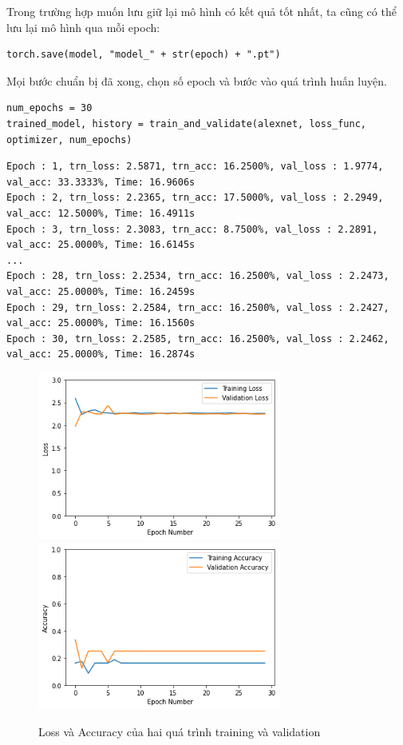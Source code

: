 \documentclass[a4paper]{article}
\begin{document}
Trong trường hợp muốn lưu giữ lại mô hình có kết quả tốt nhất, ta cũng có thể lưu lại mô hình qua mỗi epoch:
\begin{lstlisting}
torch.save(model, "model_" + str(epoch) + ".pt")
\end{lstlisting}
Mọi bước chuẩn bị đã xong, chọn số epoch và bước vào quá trình huấn luyện.
\begin{lstlisting}
num_epochs = 30
trained_model, history = train_and_validate(alexnet, loss_func, optimizer, num_epochs)
\end{lstlisting}
\begin{verbatim}
Epoch : 1, trn_loss: 2.5871, trn_acc: 16.2500%, val_loss : 1.9774, val_acc: 33.3333%, Time: 16.9606s
Epoch : 2, trn_loss: 2.2365, trn_acc: 17.5000%, val_loss : 2.2949, val_acc: 12.5000%, Time: 16.4911s
Epoch : 3, trn_loss: 2.3083, trn_acc: 8.7500%, val_loss : 2.2891, val_acc: 25.0000%, Time: 16.6145s
...
Epoch : 28, trn_loss: 2.2534, trn_acc: 16.2500%, val_loss : 2.2473, val_acc: 25.0000%, Time: 16.2459s
Epoch : 29, trn_loss: 2.2584, trn_acc: 16.2500%, val_loss : 2.2427, val_acc: 25.0000%, Time: 16.1560s
Epoch : 30, trn_loss: 2.2585, trn_acc: 16.2500%, val_loss : 2.2462, val_acc: 25.0000%, Time: 16.2874s
\end{verbatim}
\begin{figure}[h!]
\centering
{{\includegraphics[width=8cm]{images/loss.png} }}
\qquad
{{\includegraphics[width=8cm]{images/acc.png} }}
\caption*{Loss và Accuracy của hai quá trình training và validation}
\end{figure}
\end{document}
